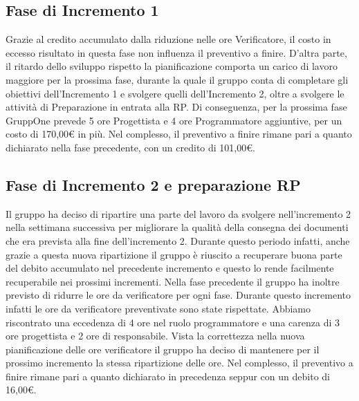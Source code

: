 \documentclass[../piano-di-progetto.tex]{subfiles}
\begin{document}
\subsection{Fase di Incremento 1}%
\label{sub:preventivo_a_finire/fase_di_incremento_1}

Grazie al credito accumulato dalla riduzione nelle ore Verificatore, il costo in eccesso risultato in questa fase non influenza il preventivo a finire.
D'altra parte, il ritardo dello sviluppo rispetto la pianificazione comporta un carico di lavoro maggiore per la prossima fase, durante la quale il gruppo conta di completare gli obiettivi dell'Incremento 1 e svolgere quelli dell'Incremento 2, oltre a svolgere le attività di Preparazione in entrata alla RP\@.
Di conseguenza, per la prossima fase GruppOne prevede 5 ore Progettista e 4 ore Programmatore aggiuntive, per un costo di 170,00€ in più.
Nel complesso, il preventivo a finire rimane pari a quanto dichiarato nella fase precedente, con un credito di 101,00€.

\subsection{Fase di Incremento 2 e preparazione RP}%
\label{sub:preventivo_a_finire/fase_di_incremento_2 e preparazione RP}

Il gruppo ha deciso di ripartire una parte del lavoro da svolgere nell'incremento 2 nella settimana successiva per migliorare la qualità della consegna dei documenti che era prevista alla fine dell'incremento 2.
Durante questo periodo infatti, anche grazie a questa nuova ripartizione il gruppo è riuscito a recuperare buona parte del debito accumulato nel precedente incremento e questo lo rende facilmente recuperabile nei prossimi incrementi.
Nella fase precedente il gruppo ha inoltre previsto di ridurre le ore da verificatore per ogni fase.
Durante questo incremento infatti le ore da verificatore preventivate sono state rispettate.
Abbiamo riscontrato una eccedenza di 4 ore nel ruolo programmatore e una carenza di 3 ore progettista e 2 ore di responsabile.
Vista la correttezza nella nuova pianificazione delle ore verificatore il gruppo ha deciso di mantenere per il prossimo incremento la stessa ripartizione delle ore.
Nel complesso, il preventivo a finire rimane pari a quanto dichiarato in precedenza seppur con un debito di 16,00€.

\end{document}
